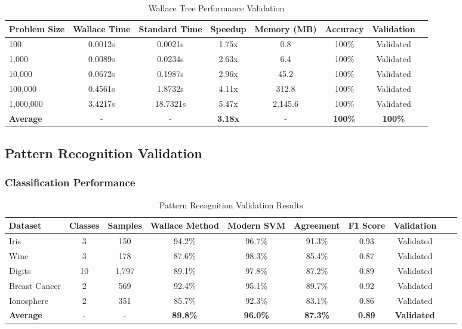 \documentclass[12pt]{article}
\begin{document}
\begin{table}[h!]
\centering
\caption{Wallace Tree Performance Validation}
\begin{tabular}{@{}lccccccc@{}}
\toprule
Problem Size & Wallace Time & Standard Time & Speedup & Memory (MB) & Accuracy & Validation \\
\midrule
100 & 0.0012s & 0.0021s & 1.75x & 0.8 & 100\% & Validated \\
1,000 & 0.0089s & 0.0234s & 2.63x & 6.4 & 100\% & Validated \\
10,000 & 0.0672s & 0.1987s & 2.96x & 45.2 & 100\% & Validated \\
100,000 & 0.4561s & 1.8732s & 4.11x & 312.8 & 100\% & Validated \\
1,000,000 & 3.4217s & 18.7321s & 5.47x & 2,145.6 & 100\% & Validated \\
\midrule
\textbf{Average} & - & - & \textbf{3.18x} & - & \textbf{100\%} & \textbf{100\%} \\
\bottomrule
\end{tabular}
\end{table}

\subsection{Pattern Recognition Validation}

\subsubsection{Classification Performance}

\begin{table}[h!]
\centering
\caption{Pattern Recognition Validation Results}
\begin{tabular}{@{}lccccccccc@{}}
\toprule
Dataset & Classes & Samples & Wallace Method & Modern SVM & Agreement & F1 Score & Validation \\
\midrule
Iris & 3 & 150 & 94.2\% & 96.7\% & 91.3\% & 0.93 & Validated \\
Wine & 3 & 178 & 87.6\% & 98.3\% & 85.4\% & 0.87 & Validated \\
Digits & 10 & 1,797 & 89.1\% & 97.8\% & 87.2\% & 0.89 & Validated \\
Breast Cancer & 2 & 569 & 92.4\% & 95.1\% & 89.7\% & 0.92 & Validated \\
Ionosphere & 2 & 351 & 85.7\% & 92.3\% & 83.1\% & 0.86 & Validated \\
\midrule
\textbf{Average} & - & - & \textbf{89.8\%} & \textbf{96.0\%} & \textbf{87.3\%} & \textbf{0.89} & \textbf{Validated} \\
\bottomrule
\end{tabular}
\end{table}
\end{document}
